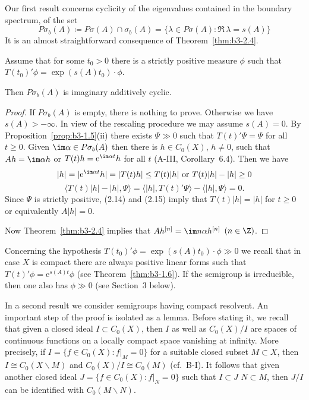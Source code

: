 Our first result concerns cyclicity of the eigenvalues contained in the boundary spectrum, \ie of the set
	\[
	P\sigma_{b}(A) \coloneqq P\sigma(A) \cap \sigma_{b}(A) = \{\lambda \in P\sigma(A) \colon \Re\,\lambda  = s(A)\}
	\]
	It is an almost straightforward consequence of Theorem~\ref{thm:b3-2.4}.
	\begin{proposition}\label{prop:b3-2.7}
		
		Assume that for some $t_{0} > 0$ there is a strictly positive measure $\phi$ such that $T(t_{0})'\phi = \exp(s(A)t_{0})\cdot\phi$.
		
		Then $P\sigma_{b}(A)$ is imaginary additively cyclic.
	\end{proposition}
\begin{proof}
	If $P\sigma_{b}(A)$ is empty, there is nothing to prove.
	Otherwise we have $s(A) > -\infty$.
	In view of the rescaling procedure we may assume $s(A) = 0$.
	By Proposition~\ref{prop:b3-1.5}(ii) there exists $\Psi \gg 0$ such that $T(t)'\Psi = \Psi$ for all $t \geq 0$.
	Given $\im \alpha \in P\sigma_{b}(A)$ then there is $h \in C_{0}(X)$, $h \neq 0$, such that $Ah = \im\alpha h$ or $T(t)h = \mathrm{e}^{\im\alpha t}h$ for all $t$ (A-III, Corollary~6.4).
%			
	Then we have
	\begin{equation}\label{eq:b3-2.14}
		|h| = |\mathrm{e}^{\im\alpha t}h| = |T(t)h| \leq T(t)|h| \text{ or } T(t)|h| - |h| \geq 0
	\end{equation}
	\begin{equation}\label{eq:b3-2.15}
		\langle T(t)|h| - |h|,\Psi \rangle = \langle |h|,T(t)'\Psi \rangle - \langle |h|,\Psi \rangle = 0.
	\end{equation}
	Since $\Psi$ is strictly positive, (2.14) and (2.15) imply that $T(t)|h| = |h|$ for $t \geq 0$ or equivalently $A|h| = 0$.
	
	Now Theorem~\ref{thm:b3-2.4} implies that $Ah^{[n]} = \im n\alpha h^{[n]}$ $(n \in \Z)$.
\end{proof}
Concerning the hypothesis $T(t_{0})'\phi = \exp(s(A)t_{0})\cdot\phi \gg 0$ we recall that in case $X$ is compact there are always positive linear forms such that $T(t)'\phi = \mathrm{e}^{s(A)t}\phi$ (see Theorem~\ref{thm:b3-1.6}).
If the semigroup is irreducible, then one also has $\phi \gg 0$ (see Section~3 below).

In a second result we consider semigroups having compact resolvent.
An important step of the proof is isolated as a lemma.
Before stating it, we recall that given a closed ideal $I \subset C_{0}(X)$, then $I$ as well as $C_{0}(X)/I$ are spaces of continuous functions on a locally compact space vanishing at infinity.
More precisely, if $I = \{f \in C_{0}(X) \colon f|_{M} = 0\}$ for a suitable closed subset $M \subset X$, then $I \cong C_{0}(X\backslash M)$ and $C_{0}(X)/I \cong C_{0}(M)$ (cf.\ B-I).
It follows that given another closed ideal $J = \{f \in C_{0}(X) \colon f|_{N} = 0\}$ such that $I \subset J$ \ie $N \subset M$, then $J/I$ can be identified with $C_{0}(M\backslash N)$.

